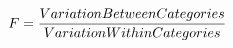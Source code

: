 \documentclass[preview]{standalone}
\begin{document}
\begin{align*}
\special{dvisvgm:raw <g id='unique000'>}F = \frac{Variation Between Categories}{Variation Within Categories}\special{dvisvgm:raw </g>}
\end{align*}
\end{document}
